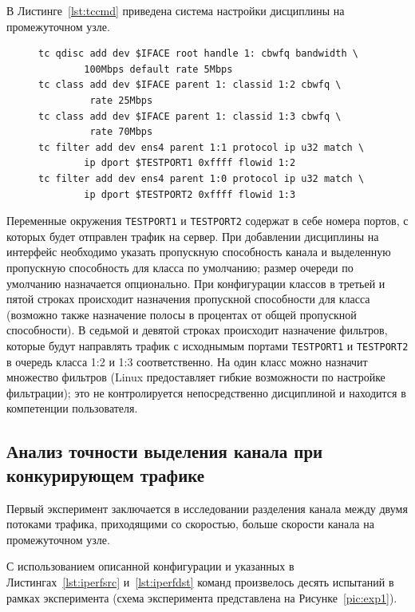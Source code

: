 		В Листинге~\ref{lst:tccmd} приведена система настройки дисциплины на промежуточном узле.
        \begin{figure}[ht!]
    		\center
    		\begin{lstlisting}[frame=lines,
    						  caption={Список команд для конфигурации дисциплины обслуживания CBWFQ.},
    						  label={lst:tccmd},
    						  style=tcstyle]
tc qdisc add dev $IFACE root handle 1: cbwfq bandwidth \
		100Mbps default rate 5Mbps
tc class add dev $IFACE parent 1: classid 1:2 cbwfq \
		 rate 25Mbps
tc class add dev $IFACE parent 1: classid 1:3 cbwfq \
		 rate 70Mbps
tc filter add dev ens4 parent 1:1 protocol ip u32 match \
        ip dport $TESTPORT1 0xffff flowid 1:2
tc filter add dev ens4 parent 1:0 protocol ip u32 match \
        ip dport $TESTPORT2 0xffff flowid 1:3
    		\end{lstlisting}
        \end{figure}
		Переменные окружения \lstinline{TESTPORT1} и \lstinline{TESTPORT2} содержат в себе номера портов,
		с которых будет отправлен трафик на сервер. При добавлении дисциплины
		на интерфейс необходимо указать пропускную способность канала и выделенную
		пропускную способность для класса по умолчанию; размер
		очереди по умолчанию назначается опционально. При конфигурации классов
		в третьей и пятой строках происходит назначения пропускной способности для класса
		(возможно также назначение полосы в процентах от общей пропускной способности).
        В седьмой и девятой строках происходит
		назначение фильтров, которые будут направлять трафик с исходнымым портами \lstinline{TESTPORT1}
		и \lstinline{TESTPORT2}
		в очередь класса 1:2 и 1:3 соответственно. На один класс можно назначит множество фильтров
		(Linux предоставляет гибкие возможности по настройке фильтрации); это не
		контролируется непосредственно дисциплиной и находится в компетенции
		пользователя. 

		\subsection{Анализ точности выделения канала при конкурирующем трафике}
			
			Первый эксперимент заключается в исследовании разделения канала между
			двумя потоками трафика, приходящими со скоростью, больше скорости канала на
			промежуточном узле.

    		С использованием описанной конфигурации и указанных в Листингах~\ref{lst:iperfsrc} и~\ref{lst:iperfdst}
			команд произвелось десять испытаний в рамках эксперимента (схема
			эксперимента представлена на Рисунке~\ref{pic:exp1}).

